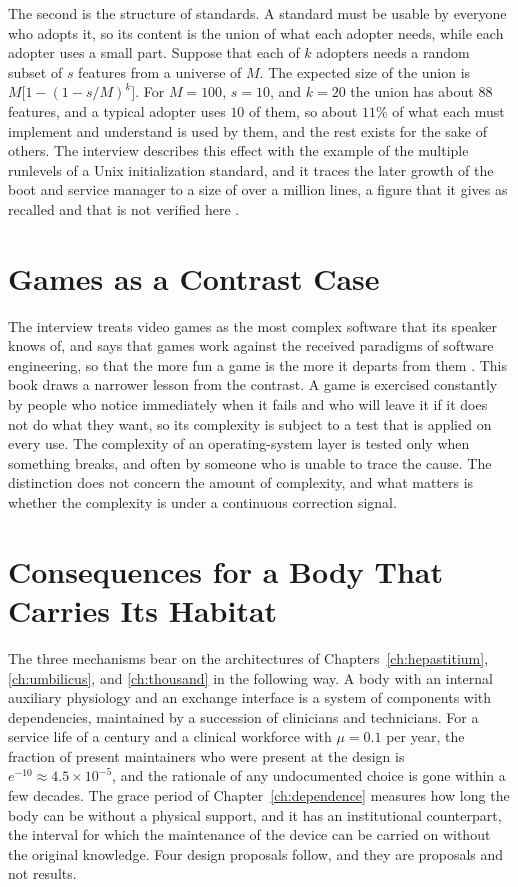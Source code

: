 \documentclass[11pt,openany]{book}
\theoremstyle{definition}
\theoremstyle{remark}
\begin{document}
The second is the structure of standards. A standard must be usable by everyone who adopts it, so its content is the union of what each adopter needs, while each adopter uses a small part. Suppose that each of $k$ adopters needs a random subset of $s$ features from a universe of $M$. The expected size of the union is $M\big[1-(1-s/M)^{k}\big]$. For $M=100$, $s=10$, and $k=20$ the union has about $88$ features, and a typical adopter uses $10$ of them, so about $11\%$ of what each must implement and understand is used by them, and the rest exists for the sake of others. The interview describes this effect with the example of the multiple runlevels of a Unix initialization standard, and it traces the later growth of the boot and service manager to a size of over a million lines, a figure that it gives as recalled and that is not verified here \cite{blow2026}.

\section{Games as a Contrast Case}

The interview treats video games as the most complex software that its speaker knows of, and says that games work against the received paradigms of software engineering, so that the more fun a game is the more it departs from them \cite{blow2026}. This book draws a narrower lesson from the contrast. A game is exercised constantly by people who notice immediately when it fails and who will leave it if it does not do what they want, so its complexity is subject to a test that is applied on every use. The complexity of an operating-system layer is tested only when something breaks, and often by someone who is unable to trace the cause. The distinction does not concern the amount of complexity, and what matters is whether the complexity is under a continuous correction signal.

\section{Consequences for a Body That Carries Its Habitat}

The three mechanisms bear on the architectures of Chapters~\ref{ch:hepastitium}, \ref{ch:umbilicus}, and \ref{ch:thousand} in the following way. A body with an internal auxiliary physiology and an exchange interface is a system of components with dependencies, maintained by a succession of clinicians and technicians. For a service life of a century and a clinical workforce with $\mu=0.1$ per year, the fraction of present maintainers who were present at the design is $e^{-10}\approx4.5\times10^{-5}$, and the rationale of any undocumented choice is gone within a few decades. The grace period of Chapter~\ref{ch:dependence} measures how long the body can be without a physical support, and it has an institutional counterpart, the interval for which the maintenance of the device can be carried on without the original knowledge. Four design proposals follow, and they are proposals and not results.
\end{document}
